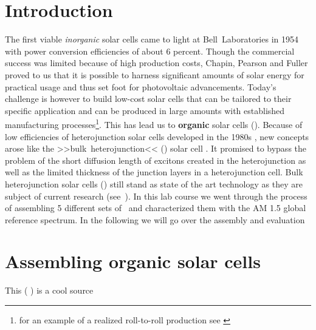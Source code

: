 \documentclass[a4paper,10pt,twocolumn]{article}
\begin{document}
\begin{extract*}

\section*{Introduction}%

The first viable \textit{inorganic} solar cells came to light at Bell~Laboratories in 1954 \cite{siliconSC_1}\cite{siliconSC_2} with power conversion efficiencies of about 6 percent. Though the commercial success was limited because of high production costs, Chapin, Pearson and Fuller proved to us that it is possible to harness significant amounts of solar energy for practical usage and thus set foot for photovoltaic advancements.\mypar
Today's challenge is however to build low-cost solar cells that can be tailored to their specific application and can be produced in large amounts with established manufacturing processes\footnote{for an example of a realized roll-to-roll production see \cite{rolltoroll}}. This has lead us to \textbf{organic} solar cells (\OSC).\mypar
Because of low efficiencies of heterojunction solar cells developed in the 1980s \cite{tang}, new concepts arose like the >>bulk~heterojunction<< (\BHJ) solar cell \cite{heterojunk}. It promised to bypass the problem of the short diffusion length of excitons created in the heterojunction as well as the limited thickness of the junction layers in a heterojunction cell.\mypar
Bulk heterojunction solar cells (\BHSC) still stand as state of the art technology as they are subject of current research (see~\cite{modernbulkhetero}). In this lab course we went through the process of assembling 5 different sets of \BHSC\ and characterized them with the {\os\sefo AM 1.5} global reference spectrum. In the following we will go over the assembly and evaluation 




\section{Assembling organic solar cells}
This (\cite{labdesc} ) is a cool source

\end{extract*}
\end{document}
